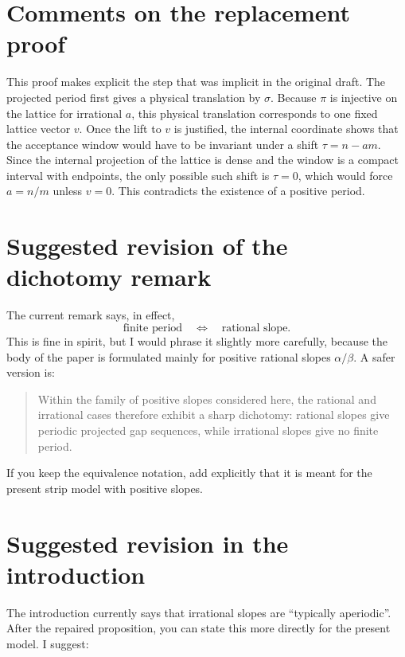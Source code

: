 \documentclass[11pt]{article}
\begin{document}
\section*{Comments on the replacement proof}

This proof makes explicit the step that was implicit in the original draft.
The projected period first gives a physical translation by \(\sigma\).  Because
\(\pi\) is injective on the lattice for irrational \(a\), this physical
translation corresponds to one fixed lattice vector \(v\).  Once the lift to
\(v\) is justified, the internal coordinate shows that the acceptance window
would have to be invariant under a shift \(\tau=n-am\).  Since the internal
projection of the lattice is dense and the window is a compact interval with
endpoints, the only possible such shift is \(\tau=0\), which would force
\(a=n/m\) unless \(v=0\).  This contradicts the existence of a positive period.

\section*{Suggested revision of the dichotomy remark}

The current remark says, in effect,
\[
    \text{finite period}
    \quad\Longleftrightarrow\quad
    \text{rational slope}.
\]
This is fine in spirit, but I would phrase it slightly more carefully, because
the body of the paper is formulated mainly for positive rational slopes
\(\alpha/\beta\).  A safer version is:

\begin{quote}
Within the family of positive slopes considered here, the rational and
irrational cases therefore exhibit a sharp dichotomy: rational slopes give
periodic projected gap sequences, while irrational slopes give no finite
period.
\end{quote}

If you keep the equivalence notation, add explicitly that it is meant for the
present strip model with positive slopes.

\section*{Suggested revision in the introduction}

The introduction currently says that irrational slopes are ``typically
aperiodic''.  After the repaired proposition, you can state this more directly
for the present model.  I suggest:
\end{document}
